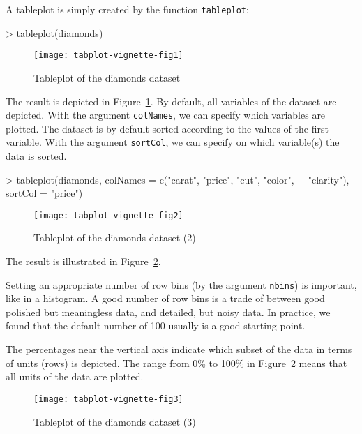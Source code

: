 \documentclass[11pt, fleqn, a4paper]{article}
\begin{document}
A tableplot is simply created by the function {\tt tableplot}:
\begin{Schunk}
\begin{Sinput}
> tableplot(diamonds)
\end{Sinput}
\end{Schunk}

\begin{figure}[htp]
\begin{center}
\texttt{[image: tabplot-vignette-fig1]}
\end{center}
\caption{Tableplot of the diamonds dataset}
\label{fig:tp1}
\end{figure}

The result is depicted in Figure~\ref{fig:tp1}. By default, all variables of the dataset are depicted. With the argument {\tt colNames}, we can specify which variables are plotted. The dataset is by default sorted according to the values of the first variable. With the argument {\tt sortCol}, we can specify on which variable(s) the data is sorted.

\begin{Schunk}
\begin{Sinput}
> tableplot(diamonds, colNames = c("carat", "price", "cut", "color", 
+     "clarity"), sortCol = "price")
\end{Sinput}
\end{Schunk}

\begin{figure}[htp]
\begin{center}
\texttt{[image: tabplot-vignette-fig2]}
\end{center}
\caption{Tableplot of the diamonds dataset (2)}
\label{fig:tp2}
\end{figure}

The result is illustrated in Figure~\ref{fig:tp2}. 

Setting an appropriate number of row bins (by the argument {\tt nbins}) is important, like in a histogram. A good number of row bins is a trade of between good polished but meaningless data, and detailed, but noisy data. In practice, we found that the default number of 100 usually is a good starting point.

The percentages near the vertical axis indicate which subset of the data in terms of units (rows) is depicted. The range from 0\% to 100\% in Figure~\ref{fig:tp2} means that all units of the data are plotted. 

\begin{figure}[htp]
\begin{center}
\texttt{[image: tabplot-vignette-fig3]}
\end{center}
\caption{Tableplot of the diamonds dataset (3)}
\label{fig:tp3}
\end{figure}
\end{document}
